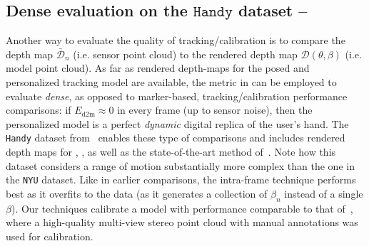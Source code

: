 \subsection{Dense evaluation on the $\texttt{Handy}$ dataset -- }
Another way to evaluate the quality of tracking/calibration is to compare the depth map $\mathcal{\bar{D}}_n$ (i.e. sensor point cloud) to the rendered depth map $\mathcal{D}(\theta,\beta)$ (i.e. model point cloud). As far as rendered depth-maps for the posed and personalized tracking model are available, the metric in  can be employed to evaluate \emph{dense}, as opposed to marker-based, tracking/calibration performance comparisons: if $E_\text{d2m}\approx0$ in every frame (up to sensor noise), then the personalized model is a perfect \emph{dynamic} digital replica of the user's hand.
The \texttt{Handy} dataset from~\cite{tkach2016sphere} enables these type of comparisons and includes rendered depth maps for \cite{htrack}, \cite{sharp2015accurate}, as well as the state-of-the-art method of~\cite{taylor2016joint}. Note how this dataset considers a range of motion substantially more complex than the one in the \texttt{NYU} dataset.
Like in earlier comparisons, the intra-frame technique performs best as it overfits to the data (as it generates a collection of $\beta_n$ instead of a single $\beta$). Our techniques calibrate a model with performance comparable to that of~\cite{tkach2016sphere}, where a high-quality multi-view stereo point cloud with manual annotations was used for calibration. 
